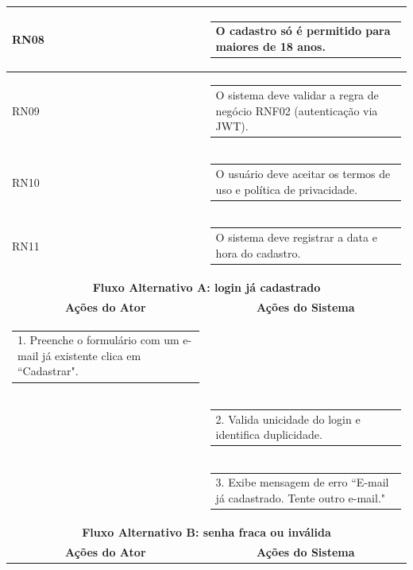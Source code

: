\begin{longtable}[c]{|p{}|p{}|}
\multicolumn{1}{|p{0.48\textwidth}|}{RN08} &
  \begin{tabular}[c]{@{}p{}@{}}O cadastro só é permitido para maiores de 18 anos.\end{tabular} \\ \hline
\multicolumn{1}{|p{0.48\textwidth}|}{RN09} &
  \begin{tabular}[c]{@{}p{}@{}}O sistema deve validar a regra de negócio RNF02 (autenticação via JWT).\end{tabular} \\ \hline
\multicolumn{1}{|p{0.48\textwidth}|}{RN10} &
  \begin{tabular}[c]{@{}p{}@{}}O usuário deve aceitar os termos de uso e política de privacidade.\end{tabular} \\ \hline
\multicolumn{1}{|p{0.48\textwidth}|}{RN11} &
  \begin{tabular}[c]{@{}p{}@{}}O sistema deve registrar a data e hora do cadastro.\end{tabular} \\ \hline
\multicolumn{2}{|c|}{\textbf{Fluxo Alternativo A: login já cadastrado}} \\ \hline
\multicolumn{1}{|c|}{\textbf{Ações do Ator}} &
  \multicolumn{1}{c|}{\textbf{Ações do Sistema}} \\ \hline
\multicolumn{1}{|p{0.48\textwidth}|}{\begin{tabular}[c]{@{}p{}@{}}1. Preenche o formulário com um e-mail já existente clica em ``Cadastrar".\end{tabular}} &
   \\ \hline
\multicolumn{1}{|p{0.48\textwidth}|}{} &
  \begin{tabular}[c]{@{}p{}@{}}2. Valida unicidade do login e identifica duplicidade.\end{tabular} \\ \hline
\multicolumn{1}{|p{0.48\textwidth}|}{} &
  \begin{tabular}[c]{@{}p{}@{}}3. Exibe mensagem de erro ``E-mail já cadastrado. Tente outro e-mail."\end{tabular} \\ \hline
\multicolumn{2}{|c|}{\textbf{Fluxo Alternativo B: senha fraca ou inválida}} \\ \hline
\multicolumn{1}{|c|}{\textbf{Ações do Ator}} &
  \multicolumn{1}{c|}{\textbf{Ações do Sistema}} \\ \hline

\end{longtable}
